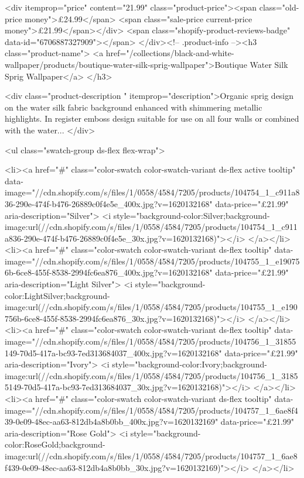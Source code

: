 {{{{{{{<div itemprop="price" content="21.99" class="product-price"><span class="old-price money">£24.99</span>
    <span class="sale-price current-price money">£21.99</span></div>
    <span class="shopify-product-reviews-badge" data-id="6706887327909"></span>
  </div><!-- .product-info --><h3 class="product-name">
      <a href="/collections/black-and-white-wallpaper/products/boutique-water-silk-sprig-wallpaper">Boutique Water Silk Sprig Wallpaper</a>
    </h3>
    
<div class="product-description " itemprop="description">Organic sprig design on the water silk fabric background enhanced with shimmering metallic highlights. In register emboss design suitable for use on all four walls or combined with the water...
</div>



<ul class="swatch-group ds-flex flex-wrap">
        
<li><a href="#" class="color-swatch color-swatch-variant ds-flex active tooltip" data-image="//cdn.shopify.com/s/files/1/0558/4584/7205/products/104754_1_c911a836-290e-474f-b476-26889c0f4e5e_400x.jpg?v=1620132168" data-price="£21.99" aria-description="Silver">
              <i style="background-color:Silver;background-image:url(//cdn.shopify.com/s/files/1/0558/4584/7205/products/104754_1_c911a836-290e-474f-b476-26889c0f4e5e_30x.jpg?v=1620132168)"></i>
            </a></li>
<li><a href="#" class="color-swatch color-swatch-variant ds-flex tooltip" data-image="//cdn.shopify.com/s/files/1/0558/4584/7205/products/104755_1_e190756b-6ce8-455f-8538-2994fc6ea876_400x.jpg?v=1620132168" data-price="£21.99" aria-description="Light Silver">
              <i style="background-color:LightSilver;background-image:url(//cdn.shopify.com/s/files/1/0558/4584/7205/products/104755_1_e190756b-6ce8-455f-8538-2994fc6ea876_30x.jpg?v=1620132168)"></i>
            </a></li>
<li><a href="#" class="color-swatch color-swatch-variant ds-flex tooltip" data-image="//cdn.shopify.com/s/files/1/0558/4584/7205/products/104756_1_31855149-70d5-417a-bc93-7ed313684037_400x.jpg?v=1620132168" data-price="£21.99" aria-description="Ivory">
              <i style="background-color:Ivory;background-image:url(//cdn.shopify.com/s/files/1/0558/4584/7205/products/104756_1_31855149-70d5-417a-bc93-7ed313684037_30x.jpg?v=1620132168)"></i>
            </a></li>
<li><a href="#" class="color-swatch color-swatch-variant ds-flex tooltip" data-image="//cdn.shopify.com/s/files/1/0558/4584/7205/products/104757_1_6ae8f439-0e09-48ec-aa63-812db4a8b0bb_400x.jpg?v=1620132169" data-price="£21.99" aria-description="Rose Gold">
              <i style="background-color:RoseGold;background-image:url(//cdn.shopify.com/s/files/1/0558/4584/7205/products/104757_1_6ae8f439-0e09-48ec-aa63-812db4a8b0bb_30x.jpg?v=1620132169)"></i>
            </a></li>

}}}}}}}
